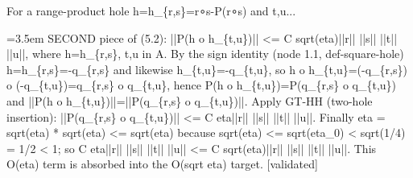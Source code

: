 \documentclass{article}
\newcommand{\step}[1]{\par\noindent\hangindent=3.5em\hangafter=1%
  \makebox[3.5em][l]{\textbf{#1.}}}
\newcommand{\steptag}[1]{\hfill{\small\textsf{[#1]}}}
\begin{document}
\begin{proofbox}{For a range-product hole h=h\_\{r,s\}=r∘s-P(r∘s) and t,u...}
\step{1.3.2} SECOND piece of (5.2): ||P(h o h\_\{t,u\})|| <= C sqrt(eta)||r|| ||s|| ||t|| ||u||, where h=h\_\{r,s\}, t,u in A. By the sign identity (node 1.1, def-square-hole) h=h\_\{r,s\}=-q\_\{r,s\} and likewise h\_\{t,u\}=-q\_\{t,u\}, so h o h\_\{t,u\}=(-q\_\{r,s\}) o (-q\_\{t,u\})=q\_\{r,s\} o q\_\{t,u\}, hence P(h o h\_\{t,u\})=P(q\_\{r,s\} o q\_\{t,u\}) and ||P(h o h\_\{t,u\})||=||P(q\_\{r,s\} o q\_\{t,u\})||. Apply GT-HH (two-hole insertion): ||P(q\_\{r,s\} o q\_\{t,u\})|| <= C eta||r|| ||s|| ||t|| ||u||. Finally eta = sqrt(eta) * sqrt(eta) <= sqrt(eta) because sqrt(eta) <= sqrt(eta\_0) < sqrt(1/4) = 1/2 < 1; so C eta||r|| ||s|| ||t|| ||u|| <= C sqrt(eta)||r|| ||s|| ||t|| ||u||. This O(eta) term is absorbed into the O(sqrt eta) target. \steptag{validated} \\[4pt]
\end{proofbox}
\end{document}
